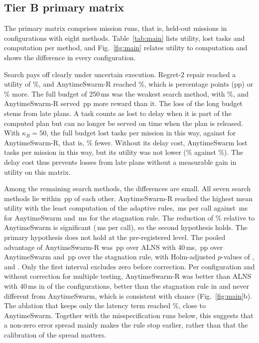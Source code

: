\subsection{Tier B primary matrix}\label{sec:tierb}
The primary matrix comprises  mission runs, that is,  held-out missions in
 configurations with eight methods. Table~\ref{tab:main} lists utility, lost tasks and computation per
method, and Fig.~\ref{fig:main} relates utility to computation and shows the difference in every configuration.

Search pays off clearly under uncertain execution. Regret-2 repair reached a utility of \%, and
AnytimeSwarm-R reached \%, which is  percentage points (pp) or \% more. The
full budget of 250\,ms was the weakest search method, with \%, and AnytimeSwarm-R served \,pp
more reward than it. The loss of the long budget stems from late plans. A task counts as lost to delay when it is part of
the computed plan but can no longer be served on time when the plan is released. With $\kappa_B=50$, the full budget
lost  tasks per mission in this way, against  for AnytimeSwarm-R, that is,
\% fewer. Without its delay cost, AnytimeSwarm lost  tasks per mission in this
way, but its utility was not lower (\% against \%). The delay cost thus prevents losses from
late plans without a measurable gain in utility on this matrix.

Among the remaining search methods, the differences are small. All seven search methods lie within
\,pp of each other. AnytimeSwarm-R reached the highest mean utility with the least computation of the adaptive rules,
\,ms per call against \,ms for AnytimeSwarm and \,ms for the stagnation rule. The
reduction of \% relative to AnytimeSwarm is significant (\,ms per call), so the second
hypothesis holds. The primary hypothesis does not hold at the pre-registered level. The pooled advantage of
AnytimeSwarm-R was \,pp over ALNS with 40\,ms, \,pp over AnytimeSwarm and \,pp
over the stagnation rule, with Holm-adjusted $p$-values of ,  and . Only the
first interval excludes zero before correction. Per configuration and without correction for multiple testing,
AnytimeSwarm-R was better than ALNS with 40\,ms in  of the  configurations, better
than the stagnation rule in  and never different from AnytimeSwarm, which is consistent with chance
(Fig.~\ref{fig:main}b). The ablation that keeps only the latency term reached \%, close to AnytimeSwarm.
Together with the misspecification runs below, this suggests that a non-zero error spread mainly makes the rule stop
earlier, rather than that the calibration of the spread matters.

